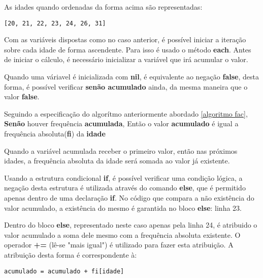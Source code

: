 \documentclass[espaco=simples,appendix=Name]{abnt}
\newcommand{\code}[1] {\textbf{#1}}
\begin{document}
As idades quando ordenadas da forma acima são representadas:

\begin{lstlisting}[caption=Idades das frequências absolutas ordenadas pelo método \code{sort}]
[20, 21, 22, 23, 24, 26, 31]
\end{lstlisting}

Com as variáveis dispostas como no caso anterior, é possível iniciar a iteração sobre cada idade de forma ascendente. Para isso é usado o método \code{each}. Antes de iniciar o cálculo, é necessário inicializar a variável que irá acumular o valor.


Quando uma váriavel é inicializada com \code{nil}, é equivalente ao negação \code{false}, desta forma, é possível verificar \textbf{senão acumulado} ainda, da mesma maneira que o valor \code{false}.

 

Seguindo a especificação do algorítmo anteriormente abordado \ref{algoritmo fac}, \code{Senão} houver frequência \code{acumulada}, Então o valor \code{acumulado} é igual a frequência absoluta(\code{fi}) da \code{idade} 

 

Quando a variável acumulada receber o primeiro valor, então nas próximos idades, a frequência absoluta da idade será somada ao valor já existente.

Usando a estrutura condicional \code{if}, é possível verificar uma condição lógica, a negação desta estrutura é utilizada através do comando \code{else}, que é permitido apenas dentro de uma declaração \code{if}. No código que compara a não existência do valor acumulado, a existência do mesmo é garantida no bloco \code{else}: linha 23.

 

Dentro do bloco \code{else}, representado neste caso apenas pela linha 24, é atribuido o valor acumulado a soma dele mesmo com a frequência absoluta existente. O operador \code{+=} (lê-se "mais igual") é utilizado para fazer esta atribuição. A atribuição desta forma é correspondente à:

\begin{lstlisting}[caption=Operador \code{+=} escrito de outra maneira ]
  acumulado = acumulado + fi[idade]
\end{lstlisting}
\end{document}
